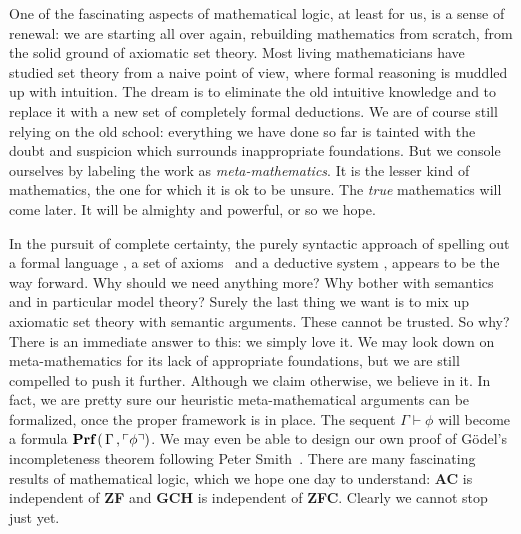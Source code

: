 One of the fascinating aspects of mathematical logic, at least for
us, is a sense of renewal: we are starting all over again,
rebuilding mathematics from scratch, from the solid ground of
axiomatic set theory. Most living mathematicians have studied set
theory from a naive point of view, where formal reasoning is muddled
up with intuition. The dream is to eliminate the old intuitive
knowledge and to replace it with a new set of completely formal
deductions. We are of course still relying on the old school:
everything we have done so far is tainted with the doubt and
suspicion which surrounds inappropriate foundations. But we console
ourselves by labeling the work as {\em meta-mathematics}. It is the
lesser kind of mathematics, the one for which it is ok to be unsure.
The {\em true} mathematics will come later. It will be almighty and
powerful, or so we hope.

In the pursuit of complete certainty, the purely syntactic approach
of spelling out a formal language \pv, a set of axioms \av\ and a
deductive system \pvs, appears to be the way forward. Why should we
need anything more? Why bother with semantics and in particular
model theory? Surely the last thing we want is to mix up axiomatic
set theory with semantic arguments. These cannot be trusted. So why?
There is an immediate answer to this: we simply love it. We may look
down on meta-mathematics for its lack of appropriate foundations,
but we are still compelled to push it further. Although we claim
otherwise, we believe in it. In fact, we are pretty sure our
heuristic meta-mathematical arguments can be formalized, once the
proper framework is in place. The sequent $\Gamma\vdash\phi$ will
become a formula $\mbox{\bf
Prf}\,(\,\Gamma\,,\ulcorner\phi\urcorner)$. We may even be able to
design our own proof of G\"odel's incompleteness theorem following
Peter Smith~\cite{SmithGodel}. There are many fascinating results of
mathematical logic, which we hope one day to understand: {\bf AC} is
independent of {\bf ZF} and {\bf GCH} is independent of {\bf ZFC}.
Clearly we cannot stop just yet.


